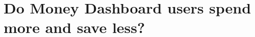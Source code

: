 
\chapter{Do Money Dashboard users spend more and save less?}%
\label{cha:eval}





\begin{subappendices}
 
\end{subappendices}

